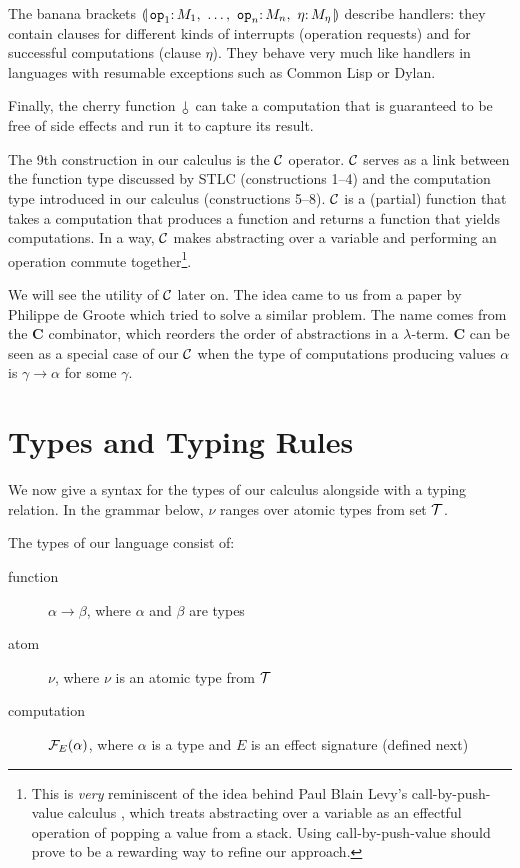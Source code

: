 The banana brackets $\cdbanana$ describe handlers: they contain clauses for
different kinds of interrupts (operation requests) and for successful
computations (clause $\eta$). They behave very much like handlers in
languages with resumable exceptions such as Common Lisp or Dylan.

Finally, the cherry function $\cherry$ can take a computation that is
guaranteed to be free of side effects and run it to capture its result.

\vspace{2em}

The 9th construction in our calculus is the $\mathcal{C}$ operator. $\mathcal{C}$ serves as
a link between the function type discussed by STLC (constructions 1--4) and
the computation type introduced in our calculus (constructions 5--8). $\mathcal{C}$
is a (partial) function that takes a computation that produces a function
and returns a function that yields computations. In a way, $\mathcal{C}$ makes
abstracting over a variable and performing an operation commute
together\footnote{This is \emph{very} reminiscent of the idea behind Paul
  Blain Levy's call-by-push-value calculus \cite{levy1999call}, which
  treats abstracting over a variable as an effectful operation of popping a
  value from a stack. Using call-by-push-value should prove to be a
  rewarding way to refine our approach.}.

We will see the utility of $\mathcal{C}$ later on. The idea came to us from a paper
by Philippe de Groote \cite{degroote2015conservativity} which tried to
solve a similar problem. The name comes from the $\mathbf{C}$ combinator,
which reorders the order of abstractions in a $\lambda$-term. $\mathbf{C}$
can be seen as a special case of our $\mathcal{C}$ when the type of computations
producing values $\alpha$ is $\gamma \to \alpha$ for some $\gamma$.


\section{Types and Typing Rules}
\label{sec:types}

We now give a syntax for the types of our calculus alongside with a typing
relation. In the grammar below, $\nu$ ranges over atomic types from set
$\mathcal{T}$.

The types of our language consist of:
\begin{description}
\item[function] $\alpha \to \beta$, where $\alpha$ and $\beta$ are types
\item[atom] $\nu$, where $\nu$ is an atomic type from $\mathcal{T}$
\item[computation] $\mathcal{F}_E(\alpha)$, where $\alpha$ is a type and $E$ is an
  effect signature (defined next)
\end{description}

